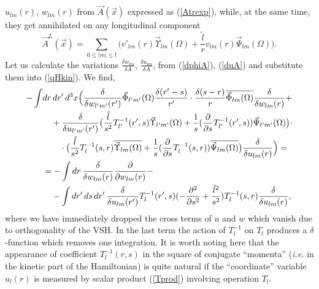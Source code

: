 \documentclass[12pt]{article}
\newcommand{\pl}{\partial}
\newcommand{\ol}{\overline}
\begin{document}
$ u_{lm}(r) $,
$ w_{lm}(r) $ from
$ \vec{A}(\vec{x}) $
	expressed as 
(\ref{Atrexp}),
	while, at the same time, they get annihilated on any longitudinal component
\begin{equation*}
    \vec{A}^{L}(\vec{x}) = \sum_{0\leq |m| \leq l} \bigl(
	v'_{lm}(r)\vec{\Upsilon}_{lm}(\Omega) +\frac{\tilde{l}}{r}v_{lm}(r)
	    \vec{\Psi}_{lm}(\Omega)\bigr) .
\end{equation*}
	Let us calculate the variations
$ \frac{\delta w_{lm}}{\delta A} $,
$ \frac{\delta u_{lm}}{\delta A} $,
	from
(\ref{dphiA}),
(\ref{duA}) and substitute them into
(\ref{qHkin}).
	We find,
\begin{align*}
    -\int& dr\, dr'\, d^{3}x \Bigl(\frac{\delta}{\delta w_{l'm'}(r')}
\vec{\Phi}_{l'm'}(\Omega) \frac{\delta(r'-s)}{r'} \cdot
	\frac{\delta(s-r)}{r} \ol{\vec{\Phi}_{lm}(\Omega)}
	    \frac{\delta}{\delta w_{lm}(r)}
    +\\
&\quad +\frac{\delta}{\delta u_{l'm'}(r')}
    \bigl(\frac{\tilde{l}}{s^{2}} T_{l'}^{-1}(r',s)
	\vec{\Upsilon}_{l'm'}(\Omega)
    +\frac{1}{s}(\frac{\pl}{\pl s}T_{l'}^{-1}(r',s))\vec{\Psi}_{l'm'}(\Omega)
	\bigr)\cdot \\
&\quad\quad \cdot \bigl(\frac{\tilde{l}}{s^{2}}T_{l}^{-1}(s,r)
    \ol{\vec{\Upsilon}_{lm}(\Omega)} +\frac{1}{s}(\frac{\pl}{\pl s}
    T_{l}^{-1}(s,r))\ol{\vec{\Psi}_{lm}(\Omega)} \bigr)
	\frac{\delta}{\delta u_{lm}(r)} \Bigr) =\\
&= -\int dr\, \frac{\delta}{\delta w_{lm}(r)} \frac{\pl}{\pl w_{lm}(r)} -\\
&\quad    -\int dr'\, ds\, dr'\, \frac{\delta}{\delta u_{lm}(r')}
    T_{l}^{-1}(r',s)
    (-\frac{\pl^{2}}{\pl s^{2}}+\frac{\tilde{l}^{2}}{s^{2}})
    T_{l}^{-1}(s,r) \frac{\delta}{\delta u_{lm}(r)} ,
\end{align*}
	where we have immediately dropped the cross terms of
$ u $ and
$ w $
	which vanish due to orthogonality of the VSH.
	In the last term the action of
$ T_{l}^{-1} $ on
$ T_{l} $
	produces a
$ \delta $-function
	which removes one integration.
	It is worth noting here that the appearance of coefficient
$ T_{l}^{-1}(r,s) $
	in the square of conjugate ``momenta''
	({\it i.e.} in the kinetic part of the Hamiltonian) is quite natural
	if the ``coordinate'' variable 
$ u_{l}(r) $
	is measured by scalar product
(\ref{Tprod})
	involving operation
$ T_{l} $.
\end{document}
